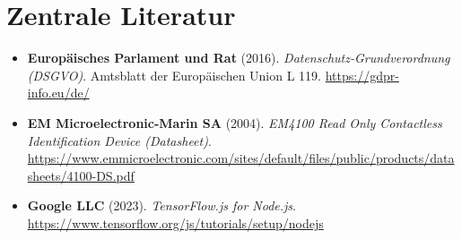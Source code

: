 \documentclass[11pt,a4paper]{article}
\begin{document}
\vspace{0.6cm}
\section*{Zentrale Literatur}
\begin{itemize}
    \small
    \item \textbf{Europäisches Parlament und Rat} (2016). \textit{Datenschutz-Grundverordnung (DSGVO)}. Amtsblatt der Europäischen Union L 119. \url{https://gdpr-info.eu/de/}
    \item \textbf{EM Microelectronic-Marin SA} (2004). \textit{EM4100 Read Only Contactless Identification Device (Datasheet)}. \url{https://www.emmicroelectronic.com/sites/default/files/public/products/datasheets/4100-DS.pdf}
    \item \textbf{Google LLC} (2023). \textit{TensorFlow.js for Node.js}. \url{https://www.tensorflow.org/js/tutorials/setup/nodejs}
\end{itemize}
\end{document}
